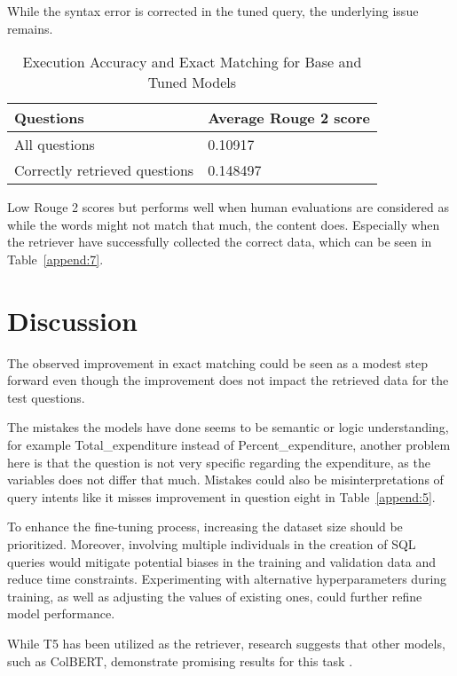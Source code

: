 \documentclass[11pt]{article}
\begin{document}
While the syntax error is corrected in the tuned query, the underlying issue remains. 



\begin{table}[h!]
\centering
\begin{tabular}{|p{}|p{}|}
\hline
\textbf{Questions} & \textbf{Average Rouge 2 score} \\ \hline
All questions           & 0.10917                   \\ \hline
Correctly retrieved questions          & 0.148497         \\ \hline          
\end{tabular}
\caption{Execution Accuracy and Exact Matching for Base and Tuned Models}
\label{tab:Rouge}
\end{table}

Low Rouge 2 scores but performs well when human evaluations are considered as while the words might not match that much, the content does. Especially when the retriever have successfully collected the correct data, which can be seen in Table~\ref{append:7}.

\section{Discussion}

The observed improvement in exact matching could be seen as a modest step forward even though the improvement does not impact the retrieved data for the test questions. 

The mistakes the models have done seems to be semantic or logic understanding, for example Total\_expenditure instead of Percent\_expenditure, another problem here is that the question is not very specific regarding the expenditure, as the variables does not differ that much. Mistakes could also be misinterpretations of query intents like it misses improvement in question eight in Table~\ref{append:5}.

To enhance the fine-tuning process, increasing the dataset size should be prioritized. Moreover, involving multiple individuals in the creation of SQL queries would mitigate potential biases in the training and validation data and reduce time constraints. Experimenting with alternative hyperparameters during training, as well as adjusting the values of existing ones, could further refine model performance.

While T5 has been utilized as the retriever, research suggests that other models, such as ColBERT, demonstrate promising results for this task \cite{Lin2023}.
\end{document}

